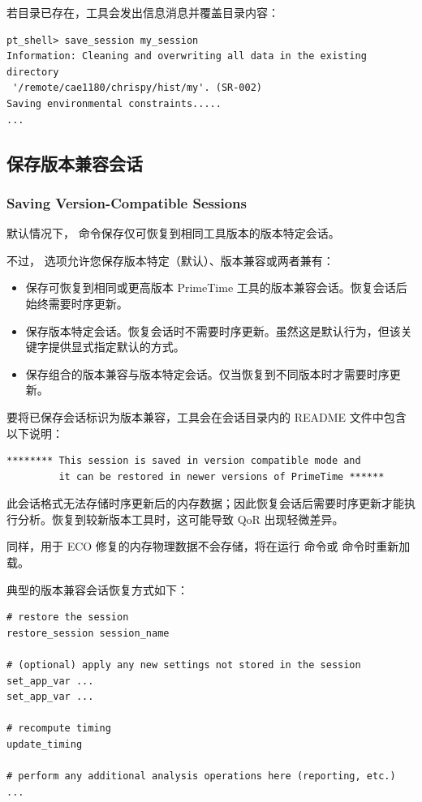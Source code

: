 若目录已存在，工具会发出信息消息并覆盖目录内容：
\begin{lstlisting}
pt_shell> save_session my_session
Information: Cleaning and overwriting all data in the existing directory
 '/remote/cae1180/chrispy/hist/my'. (SR-002)
Saving environmental constraints.....
...
\end{lstlisting}

\subsection{保存版本兼容会话}
\subsubsection*{Saving Version-Compatible Sessions}

默认情况下， 命令保存仅可恢复到相同工具版本的版本特定会话。

不过， 选项允许您保存版本特定（默认）、版本兼容或两者兼有：
\begin{itemize}
  \item {}

        保存可恢复到相同或更高版本 PrimeTime 工具的版本兼容会话。恢复会话后始终需要时序更新。
  \item {}

        保存版本特定会话。恢复会话时不需要时序更新。虽然这是默认行为，但该关键字提供显式指定默认的方式。
  \item {}

        保存组合的版本兼容与版本特定会话。仅当恢复到不同版本时才需要时序更新。
\end{itemize}

要将已保存会话标识为版本兼容，工具会在会话目录内的 README 文件中包含以下说明：
\begin{lstlisting}
******** This session is saved in version compatible mode and
         it can be restored in newer versions of PrimeTime ******
\end{lstlisting}

此会话格式无法存储时序更新后的内存数据；因此恢复会话后需要时序更新才能执行分析。恢复到较新版本工具时，这可能导致 QoR 出现轻微差异。

同样，用于 ECO 修复的内存物理数据不会存储，将在运行  命令或  命令时重新加载。

典型的版本兼容会话恢复方式如下：
\begin{lstlisting}
# restore the session
restore_session session_name

# (optional) apply any new settings not stored in the session
set_app_var ...
set_app_var ...

# recompute timing
update_timing

# perform any additional analysis operations here (reporting, etc.)
...
\end{lstlisting}

